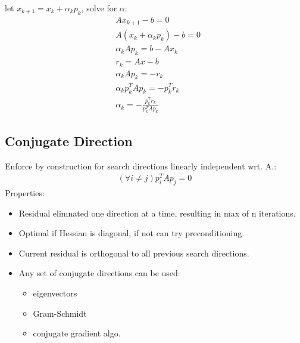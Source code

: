 \documentclass[8pt,letter]{article}
\begin{document}
\begin{multicols*}{2}
  let $x_{k+1} = x_k + \alpha_k p_k$, solve for $\alpha$:
  \begin{align*}
    &Ax_{k+1}-b=0\\
    &A(x_k+\alpha_k p_k) - b=0\\
    &\alpha_k A p_k = b - Ax_k\\
    &r_k = Ax-b\\
    &\alpha_k A p_k = -r_k\\
    &\alpha_k p_k^T A p_k = - p_k^T r_k\\
    &\alpha_k = - \frac{p_k^T r_k}{p_k^T A p_k}
  \end{align*}
  \subsection{Conjugate Direction}
  
  Enforce by construction for search directions linearly independent wrt. A.:
  \begin{align*}
    (\forall i\not=j) p_i^T A p_j = 0
  \end{align*}
  Properties:
  \begin{itemize}
  \item Residual elimnated one direction at a time, resulting in max of n iterations.
  \item Optimal if Hessian is diagonal, if not can try preconditioning.
  \item Current residual is orthogonal to all previous search directions.
  \item Any set of conjugate directions can be used:
    \begin{itemize}
    \item eigenvectors
    \item Gram-Schmidt
    \item conjugate gradient algo.
    \end{itemize}
  \end{itemize}

  \vfill\null
  \columnbreak
    

\end{multicols*}
\end{document}
